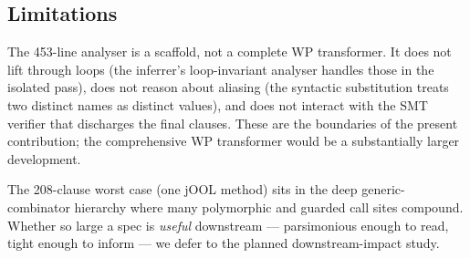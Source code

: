 \subsection{Limitations}

The 453-line analyser is a scaffold, not a complete WP transformer.
It does not lift through loops (the inferrer's loop-invariant
analyser handles those in the isolated pass), does not reason about
aliasing (the syntactic substitution treats two distinct names as
distinct values), and does not interact with the SMT verifier that
discharges the final clauses. These are the boundaries of the
present contribution; the comprehensive WP transformer would be a
substantially larger development.

The 208-clause worst case (one jOOL method) sits in the deep
generic-combinator hierarchy where many polymorphic and guarded call
sites compound. Whether so large a spec is \emph{useful} downstream
--- parsimonious enough to read, tight enough to inform --- we defer
to the planned downstream-impact study.
